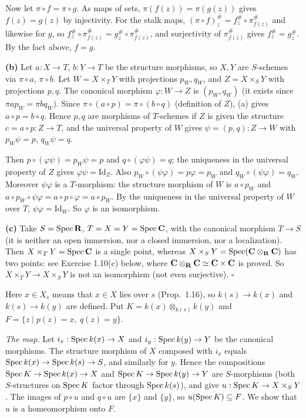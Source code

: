 \documentclass[11pt]{article}
\begin{document}
Now let $\pi\circ f=\pi\circ g$. As maps of sets, $\pi(f(z))=\pi(g(z))$ gives $f(z)=g(z)$ by injectivity. For the stalk maps, $(\pi\circ f)^\#_z=f^\#_z\circ\pi^\#_{f(z)}$ and likewise for $g$, so $f^\#_z\circ\pi^\#_{f(z)}=g^\#_z\circ\pi^\#_{f(z)}$, and surjectivity of $\pi^\#_{f(z)}$ gives $f^\#_z=g^\#_z$. By the fact above, $f=g$.

\textbf{(b)} Let $a:X\to T$, $b:Y\to T$ be the structure morphisms, so $X,Y$ are $S$-schemes via $\pi\circ a$, $\pi\circ b$. Let $W=X\times_TY$ with projections $p_W,q_W$, and $Z=X\times_SY$ with projections $p,q$. The canonical morphism $\varphi:W\to Z$ is $(p_W,q_W)$ (it exists since $\pi a p_W=\pi b q_W$). Since $\pi\circ(a\circ p)=\pi\circ(b\circ q)$ (definition of $Z$), (a) gives $a\circ p=b\circ q$. Hence $p,q$ are morphisms of $T$-schemes if $Z$ is given the structure $c=a\circ p:Z\to T$, and the universal property of $W$ gives $\psi=(p,q):Z\to W$ with $p_W\psi=p$, $q_W\psi=q$.

Then $p\circ(\varphi\psi)=p_W\psi=p$ and $q\circ(\varphi\psi)=q$; the uniqueness in the universal property of $Z$ gives $\varphi\psi=\mathrm{Id}_Z$. Also $p_W\circ(\psi\varphi)=p\varphi=p_W$ and $q_W\circ(\psi\varphi)=q_W$. Moreover $\psi\varphi$ is a $T$-morphism: the structure morphism of $W$ is $a\circ p_W$ and $a\circ p_W\circ\psi\varphi=a\circ p\circ\varphi=a\circ p_W$. By the uniqueness in the universal property of $W$ over $T$, $\psi\varphi=\mathrm{Id}_W$. So $\varphi$ is an isomorphism.

\textbf{(c)} Take $S=\operatorname{Spec}\mathbf R$, $T=X=Y=\operatorname{Spec}\mathbf C$, with the canonical morphism $T\to S$ (it is neither an open immersion, nor a closed immersion, nor a localization). Then $X\times_TY=\operatorname{Spec}\mathbf C$ is a single point, whereas $X\times_SY=\operatorname{Spec}(\mathbf C\otimes_\mathbf R\mathbf C)$ has two points: see Exercise 1.10(c) below, where $\mathbf C\otimes_\mathbf R\mathbf C\simeq\mathbf C\times\mathbf C$ is proved. So $X\times_TY\to X\times_SY$ is not an isomorphism (not even surjective). \hfill$\square$

\pf
Here $x\in X_s$ means that $x\in X$ lies over $s$ (Prop.~1.16), so $k(s)\to k(x)$ and $k(s)\to k(y)$ are defined. Put $K=k(x)\otimes_{k(s)}k(y)$ and $F=\{z\mid p(z)=x,\ q(z)=y\}$.

\emph{The map.} Let $i_x:\operatorname{Spec} k(x)\to X$ and $i_y:\operatorname{Spec} k(y)\to Y$ be the canonical morphisms. The structure morphism of $X$ composed with $i_x$ equals $\operatorname{Spec} k(x)\to\operatorname{Spec} k(s)\to S$, and similarly for $y$. Hence the compositions $\operatorname{Spec} K\to\operatorname{Spec} k(x)\to X$ and $\operatorname{Spec} K\to\operatorname{Spec} k(y)\to Y$ are $S$-morphisms (both $S$-structures on $\operatorname{Spec} K$ factor through $\operatorname{Spec} k(s)$), and give $u:\operatorname{Spec} K\to X\times_SY$. The images of $p\circ u$ and $q\circ u$ are $\{x\}$ and $\{y\}$, so $u(\operatorname{Spec} K)\subseteq F$. We show that $u$ is a homeomorphism onto $F$.
\end{document}
